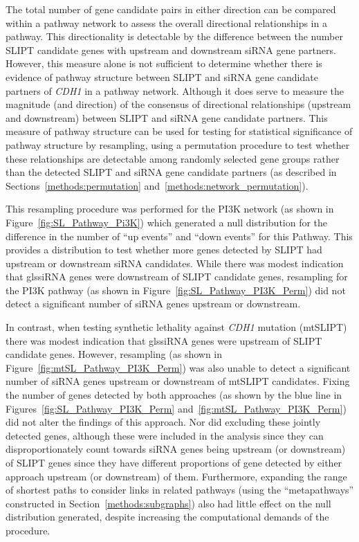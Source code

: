The total number of gene candidate pairs in either direction can be compared within a pathway network to assess the overall directional relationships in a pathway. This directionality is detectable by the difference between the number \gls{SLIPT} candidate genes with upstream and downstream \gls{siRNA} gene partners. However, this measure alone is not sufficient to determine whether there is evidence of pathway structure between \gls{SLIPT} and \gls{siRNA} gene candidate partners of \textit{CDH1} in a pathway network. Although it does serve to measure the magnitude (and direction) of the consensus of directional relationships (upstream and downstream) between \gls{SLIPT} and \gls{siRNA} gene candidate partners. This measure of pathway structure can be used for testing for statistical significance of pathway structure by resampling, using a permutation procedure to test whether these relationships are detectable among randomly selected gene groups rather than the detected \gls{SLIPT} and \gls{siRNA} gene candidate partners (as described in Sections~\ref{methods:permutation} and~\ref{methods:network_permutation}).

This resampling procedure was performed for the PI3K network (as shown in Figure~\ref{fig:SL_Pathway_Pi3K}) which generated a null distribution for the difference in the number of ``up events'' and ``down events'' for this Pathway. This provides a distribution to test whether more genes detected by \gls{SLIPT} had upstream or downstream \gls{siRNA} candidates. While there was modest indication that gls{siRNA} genes were downstream of \gls{SLIPT} candidate genes, resampling for the PI3K pathway (as shown in Figure~\ref{fig:SL_Pathway_PI3K_Perm}) did not detect a significant number of \gls{siRNA} genes upstream or downstream.

In contrast, when testing synthetic lethality against \textit{CDH1} mutation (mtSLIPT) there was modest indication that gls{siRNA} genes were upstream of \gls{SLIPT} candidate genes. However, resampling (as shown in Figure~\ref{fig:mtSL_Pathway_PI3K_Perm}) was also unable to detect a significant number of \gls{siRNA} genes upstream or downstream of mtSLIPT candidates. Fixing the number of genes detected by both approaches (as shown by the blue line in Figures~\ref{fig:SL_Pathway_PI3K_Perm} and~\ref{fig:mtSL_Pathway_PI3K_Perm}) did not alter the findings of this approach. Nor did excluding these jointly detected genes, although these were included in the analysis since they can disproportionately count towards \gls{siRNA} genes being upstream (or downstream) of \gls{SLIPT} genes since they have different proportions of gene detected by either approach upstream (or downstream) of them. Furthermore, expanding the range of shortest paths to consider links in related pathways (using the ``metapathways'' constructed in Section~\ref{methods:subgraphs}) also had little effect on the null distribution generated, despite increasing the computational demands of the procedure.


